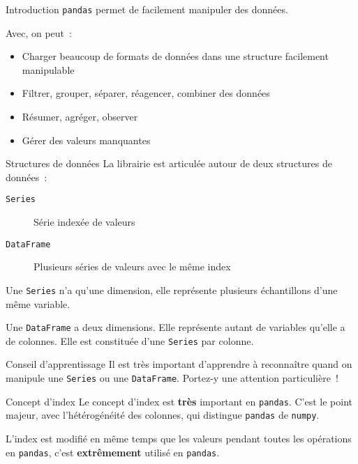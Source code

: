 \begin{frame}{Introduction}
  \texttt{pandas} permet de facilement manipuler des données.

  Avec, on peut~:

  \begin{itemize}
    \item Charger beaucoup de formats de données dans une structure facilement manipulable
    \item Filtrer, grouper, séparer, réagencer, combiner des données
    \item Résumer, agréger, observer
    \item Gérer des valeurs manquantes
  \end{itemize}
\end{frame}

\begin{frame}{Structures de données}
  La librairie est articulée autour de deux structures de données~:

  \begin{description}
    \item[\texttt{Series}] Série indexée de valeurs
    \item[\texttt{DataFrame}] Plusieurs séries de valeurs avec le même index
  \end{description}

  Une \texttt{Series} n'a qu'une dimension, elle représente plusieurs échantillons d'une même variable.

  Une \texttt{DataFrame} a deux dimensions. Elle représente autant de variables qu'elle a de colonnes. Elle est constituée d'une \texttt{Series} par colonne.

  \begin{alertblock}{Conseil d'apprentissage}
    Il est très important d'apprendre à reconnaître quand on manipule une \texttt{Series} ou une \texttt{DataFrame}. Portez-y une attention particulière~!
  \end{alertblock}
\end{frame}

\begin{frame}{Concept d'index}
  Le concept d'index est \textbf{très} important en \texttt{pandas}. C'est le point majeur, avec l'hétérogénéité des colonnes, qui distingue \texttt{pandas} de \texttt{numpy}.

  L'index est modifié en même temps que les valeurs pendant toutes les opérations en \texttt{pandas}, c'est \textbf{extrêmement} utilisé en \texttt{pandas}.

\end{frame}

